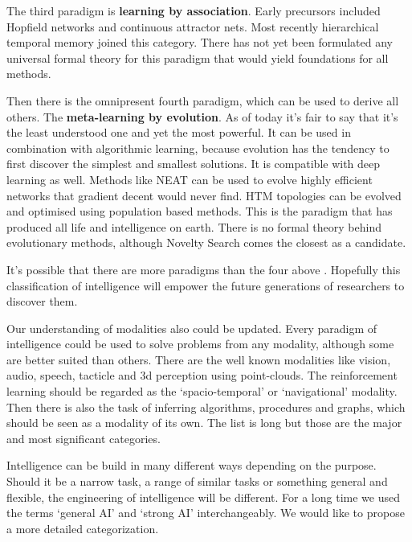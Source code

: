 \documentclass[12pt]{article}
\begin{document}
The third paradigm is \textbf{learning by association}. Early precursors included Hopfield networks and continuous attractor nets. Most recently hierarchical temporal memory joined this category. There has not yet been formulated any universal formal theory for this paradigm that would yield foundations for all methods. 

Then there is the omnipresent fourth paradigm, which can be used to derive all others. The \textbf{meta-learning by evolution}. As of today it's fair to say that it's the least understood one and yet the most powerful. It can be used in combination with algorithmic learning, because evolution has the tendency to first discover the simplest and smallest solutions.
It is compatible with deep learning as well. Methods like NEAT can be used to evolve highly efficient networks that gradient decent would never find. HTM topologies can be evolved and optimised using population based methods. This is the paradigm that has produced all life and intelligence on earth. There is no formal theory behind evolutionary methods, although Novelty Search comes the closest as a candidate.

It's possible that there are more paradigms than the four above . Hopefully this classification of intelligence will empower the future generations of researchers to discover them. 

Our understanding of modalities also could be updated. Every paradigm of intelligence could be used to solve problems from any modality, although some are better suited than others. 
There are the well known modalities like vision, audio, speech, tacticle and 3d perception using point-clouds. The reinforcement learning should be regarded as the `spacio-temporal' or `navigational' modality. Then there is also the task of inferring algorithms, procedures and graphs, which should be seen as a modality of its own. The list is long but those are the major and most significant categories.

Intelligence can be build in many different ways depending on the purpose. Should it be a narrow task, a range of similar tasks or something general and flexible, the engineering of intelligence will be different. For a long time we used the terms `general AI' and `strong AI' interchangeably. We would like to propose a more detailed categorization.
\end{document}
